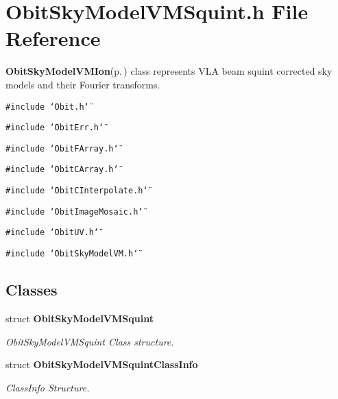 \section{Obit\-Sky\-Model\-VMSquint.h File Reference}
\label{ObitSkyModelVMSquint_8h}
{\bf Obit\-Sky\-Model\-VMIon}{\rm (p.\,\pageref{structObitSkyModelVMIon})} class represents VLA beam squint corrected sky models and their Fourier transforms. 

{\tt \#include \char`\"{}Obit.h\char`\"{}}\par
{\tt \#include \char`\"{}Obit\-Err.h\char`\"{}}\par
{\tt \#include \char`\"{}Obit\-FArray.h\char`\"{}}\par
{\tt \#include \char`\"{}Obit\-CArray.h\char`\"{}}\par
{\tt \#include \char`\"{}Obit\-CInterpolate.h\char`\"{}}\par
{\tt \#include \char`\"{}Obit\-Image\-Mosaic.h\char`\"{}}\par
{\tt \#include \char`\"{}Obit\-UV.h\char`\"{}}\par
{\tt \#include \char`\"{}Obit\-Sky\-Model\-VM.h\char`\"{}}\par
\subsection*{Classes}
\begin{CompactItemize}
\item 
struct {\bf Obit\-Sky\-Model\-VMSquint}
\begin{CompactList}\small\item\em Obit\-Sky\-Model\-VMSquint Class structure. \item\end{CompactList}\item 
struct {\bf Obit\-Sky\-Model\-VMSquint\-Class\-Info}
\begin{CompactList}\small\item\em Class\-Info Structure. \item\end{CompactList}\end{CompactItemize}
